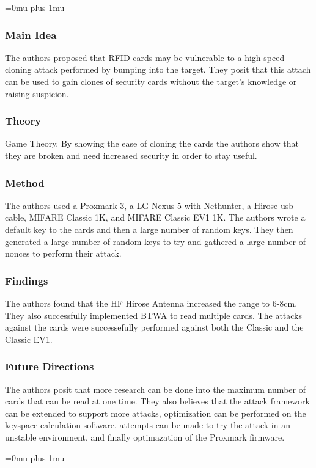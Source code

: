 \Urlmuskip=0mu plus 1mu\relax

\subsubsection{Main Idea}

\noindent
The authors proposed that RFID cards may be vulnerable to a high speed cloning attack performed by bumping into the target.  They posit that this attach can be used to gain clones of security cards without the target's knowledge or raising suspicion.

\subsubsection{Theory}

\noindent
Game Theory.  By showing the ease of cloning the cards the authors show that they are broken and need increased security in order to stay useful.

\subsubsection{Method}

\noindent
The authors used a Proxmark 3, a LG Nexus 5 with Nethunter, a Hirose usb cable, MIFARE Classic 1K, and MIFARE Classic EV1 1K.  The authors wrote a default key to the cards and then a large number of random keys.  They then generated a large number of random keys to try and gathered a large number of nonces to perform their attack.

\subsubsection{Findings}

\noindent
The authors found that the HF Hirose Antenna increased the range to 6-8cm.  They also successfully implemented BTWA to read multiple cards.  The attacks against the cards were successefully performed against both the Classic and the Classic EV1.

\subsubsection{Future Directions}

\noindent
The authors posit that more research can be done into the maximum number of cards that can be read at one time.  They also believes that the attack framework can be extended to support more attacks, optimization can be performed on the keyspace calculation software, attempts can be made to try the attack in an unstable environment, and finally optimazation of the Proxmark firmware.

\Urlmuskip=0mu plus 1mu\relax
\pagebreak